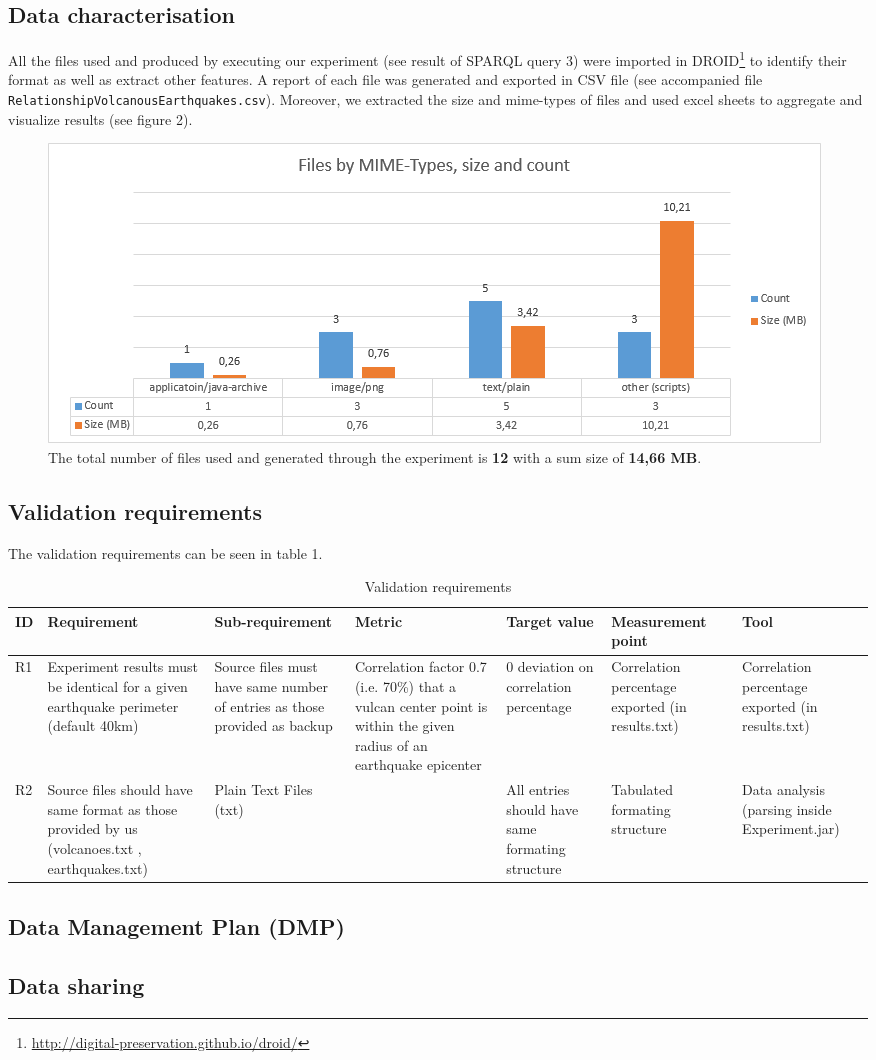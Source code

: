 \documentclass[12pt, a4paper]{article}
\begin{document}
\subsection{Data characterisation}
All the files used and produced by executing our experiment (see result of SPARQL query 3) were imported in DROID\footnote{\url{http://digital-preservation.github.io/droid/}} to identify their format as well as extract other features. A report of each file was generated and exported in CSV file (see accompanied file \verb|RelationshipVolcanousEarthquakes.csv|). Moreover, we extracted the size and mime-types of files and used excel sheets to aggregate and visualize results (see figure 2).
\begin{figure}[h]
  \centering
    \includegraphics[scale=0.85]{graph}
    \caption{The total number of files used and generated through the experiment is {\bf 12} with a sum size of {\bf 14,66 MB}.}
\end{figure}

\subsection{Validation requirements}
The validation requirements can be seen in table 1.
\begin{table}[h]
\centering
\begin{tabular}{|p{0.5cm}|p{3.0cm}|p{3.5cm}|p{3.0cm}|p{1.5cm}|p{3.0cm}|p{2.0cm}|}
\hline
 \textbf{ID} & \textbf{Requirement} & \textbf{Sub-requirement} & \textbf{Metric} & \textbf{Target value} & \textbf{Measurement point} & \textbf{Tool} \\ \hline
 R1 & Experiment results must be identical for a given earthquake perimeter (default 40km) & Source files must have same number of entries as those provided as backup & 
Correlation factor 0.7 (i.e. 70\%) that a vulcan center point is within the given radius of an earthquake epicenter
 & 0 deviation on correlation percentage & Correlation percentage exported (in results.txt) & Correlation percentage exported (in results.txt) \\ \hline
 R2 &  Source files should have same format as those provided by us (volcanoes.txt , earthquakes.txt) & Plain Text Files (txt) & &
All entries should have same formating structure & Tabulated formating structure & Data analysis (parsing inside Experiment.jar)      \\ \hline
\end{tabular}
\caption{Validation requirements}
\end{table}

\subsection{Data Management Plan (DMP)}
\subsection{Data sharing}
\end{document}
